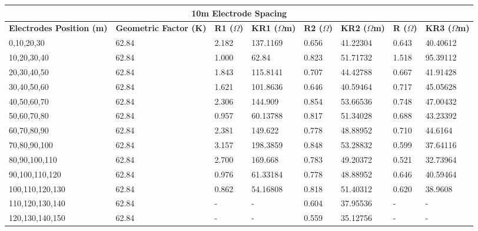 \documentclass[12pt,a4paper]{report}
\begin{document}
\begin{itemize}
\begin{table}[h!]
    \centering
    \begin{adjustbox}{max width=\textwidth}
    \setlength{\tabcolsep}{15pt}
    \renewcommand{\arraystretch}{1.5}
    \begin{tabular}{|p{3.5cm}|p{2.5cm}|p{1.8cm}|p{2.2cm}|p{1.8cm}|p{2.2cm}|p{1.8cm}|p{2.2cm}|}
    \hline
    \multicolumn{8}{|c|}{\rule{0pt}{3em}\huge\textbf{10m Electrode Spacing}} \\ [0.5cm]
    \hline
    \textbf{Electrodes Position (m)} & \textbf{Geometric Factor (K)} & \textbf{R1 ($\Omega$)} & \textbf{KR1 ($\Omega$m)} & \textbf{R2 ($\Omega$)} & \textbf{KR2 ($\Omega$m)} & \textbf{R ($\Omega$)} & \textbf{KR3 ($\Omega$m)} \\ \hline
    0,10,20,30 & 62.84 & 2.182 & 137.1169 & 0.656 & 41.22304 & 0.643 & 40.40612 \\ \hline
    10,20,30,40 & 62.84 & 1.000 & 62.84 & 0.823 & 51.71732 & 1.518 & 95.39112 \\ \hline
    20,30,40,50 & 62.84 & 1.843 & 115.8141 & 0.707 & 44.42788 & 0.667 & 41.91428 \\ \hline
    30,40,50,60 & 62.84 & 1.621 & 101.8636 & 0.646 & 40.59464 & 0.717 & 45.05628 \\ \hline
    40,50,60,70 & 62.84 & 2.306 & 144.909 & 0.854 & 53.66536 & 0.748 & 47.00432 \\ \hline
    50,60,70,80 & 62.84 & 0.957 & 60.13788 & 0.817 & 51.34028 & 0.688 & 43.23392 \\ \hline
    60,70,80,90 & 62.84 & 2.381 & 149.622 & 0.778 & 48.88952 & 0.710 & 44.6164 \\ \hline
    70,80,90,100 & 62.84 & 3.157 & 198.3859 & 0.848 & 53.28832 & 0.599 & 37.64116 \\ \hline
    80,90,100,110 & 62.84 & 2.700 & 169.668 & 0.783 & 49.20372 & 0.521 & 32.73964 \\ \hline
    90,100,110,120 & 62.84 & 0.976 & 61.33184 & 0.778 & 48.88952 & 0.646 & 40.59464 \\ \hline
    100,110,120,130 & 62.84 & 0.862 & 54.16808 & 0.818 & 51.40312 & 0.620 & 38.9608 \\ \hline
    110,120,130,140 & 62.84 & - & - & 0.604 & 37.95536 & - & - \\ \hline
    120,130,140,150 & 62.84 & - & - & 0.559 & 35.12756 & - & - \\ \hline
    \end{tabular}
\end{adjustbox}
\end{table}


\end{itemize}
\end{document}
